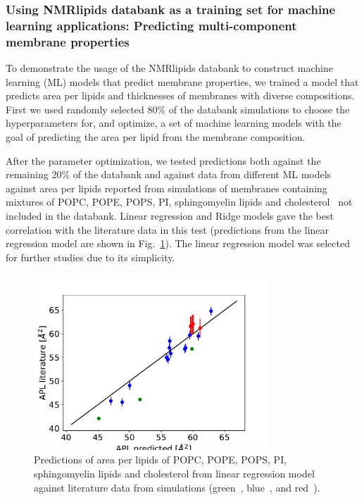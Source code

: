 \documentclass[fleqn,10pt]{wlscirep}
\begin{document}
\subsubsection{Using NMRlipids databank as a training set for machine learning applications: Predicting multi-component membrane properties}

To demonstrate the usage of the NMRlipids databank to construct machine learning (ML) models that predict membrane properties, we trained a model that predicts area per lipids and thicknesses of membranes with diverse compositions. First we used randomly selected 80\% of the databank simulations to choose the hyperparameters for, and optimize, a set of machine learning models with the goal of predicting the area per lipid from the membrane composition.


 After the parameter optimization, we tested predictions both against the remaining 20\% of the databank and against data from different ML models against area per lipids reported from simulations of membranes containing mixtures of POPC, POPE, POPS, PI, sphingomyelin lipids and cholesterol~\cite{shahane19,kumar21,oliveira22} not included in the databank. Linear regression and Ridge models gave the best correlation with the literature data in this test (predictions  from the linear regression model are shown in Fig.~\ref{fig:LinearRegressionTest}). The linear regression model was selected for further studies due to its simplicity.
\begin{figure}
    \centering
    \includegraphics[width=88mm]{Figures/LinearRegressionTest.pdf}
    \caption{Predictions of area per lipids of POPC, POPE, POPS, PI, sphingomyelin lipids and cholesterol from linear regression model against literature data from simulations (green~\cite{shahane19}, blue~\cite{kumar21}, and red~\cite{oliveira22}).}
    \label{fig:LinearRegressionTest}
\end{figure}
\end{document}
